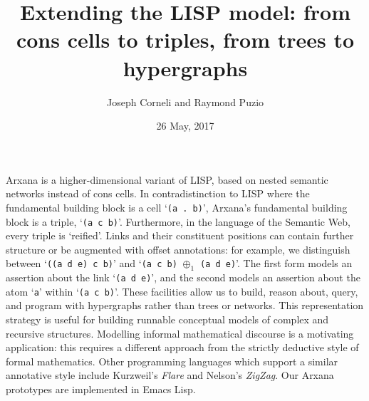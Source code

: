 \documentclass[acmlarge]{acmart}
\author{Joseph Corneli and Raymond Puzio}
\date{26 May, 2017}
\title[Talk]{Extending the LISP model: from cons cells to triples, from trees to hypergraphs}
\begin{document}
\maketitle
\thispagestyle{fancy}

Arxana is a higher-dimensional variant of LISP, based on
nested semantic networks instead of cons cells.  In contradistinction
to LISP where the fundamental building block is a cell
`\verb|(a . b)|', Arxana's fundamental building block is a triple,
`\verb|(a c b)|'.  Furthermore, in the language of the Semantic Web,
every triple is `reified'.  Links and their constituent positions can
contain further structure or be augmented with offset annotations: for
example, we distinguish between `\verb|((a d e) c b)|' and
`\verb|(a c b)| \(\oplus_1\) \verb|(a d e)|'.  The first form models
an assertion about the link `\verb|(a d e)|', and the second models an
assertion about the atom `\verb|a|' within `\verb|(a c b)|'.  These
facilities allow us to build, reason about, query, and program with
hypergraphs rather than trees or networks.  This representation
strategy is useful for building runnable conceptual models of complex
and recursive structures.  Modelling informal mathematical discourse is a
motivating application: this requires a different approach from
the strictly deductive style of formal mathematics.  Other programming
languages which support a similar annotative style include Kurzweil's
\emph{Flare} and Nelson's \emph{ZigZag}.  Our Arxana prototypes are
implemented in Emacs Lisp.
\end{document}

